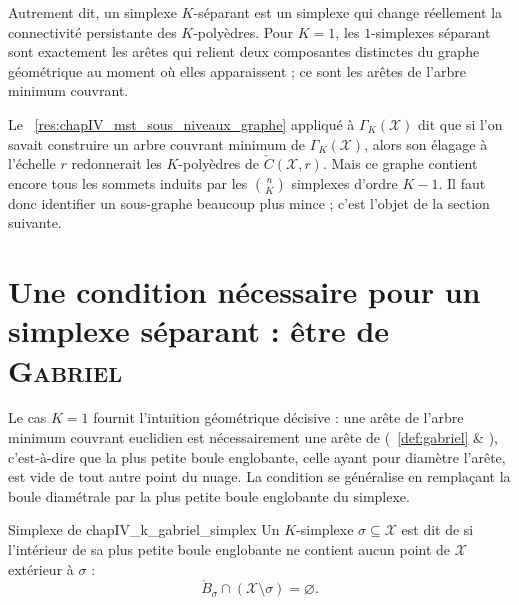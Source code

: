 Autrement dit, un simplexe $K$-séparant est un simplexe qui change réellement la connectivité persistante des $K$-polyèdres. Pour $K=1$, les $1$-simplexes séparant sont exactement les arêtes qui relient deux composantes distinctes du graphe géométrique au moment où elles apparaissent ; ce sont les arêtes de l'arbre minimum couvrant.

Le \Res~\ref{res:chapIV_mst_sous_niveaux_graphe} appliqué à $\Gamma_K(\mathcal X)$ dit que si l'on savait construire un arbre couvrant minimum de $\Gamma_K(\mathcal X)$, alors son élagage à l'échelle $r$ redonnerait les $K$-polyèdres de $\check C(\mathcal X,r)$. Mais ce graphe contient encore tous les sommets induits par les $\binom n{K}$ simplexes d'ordre $K-1$. Il faut donc identifier un sous-graphe beaucoup plus mince ; c'est l'objet de la section suivante.

\section{Une condition nécessaire pour un simplexe séparant : être de \textsc{Gabriel}}
\label{sec:chapIV_k_gabriel}

Le cas $K=1$ fournit l'intuition géométrique décisive : une arête de l'arbre minimum couvrant euclidien est nécessairement une arête de  (\Def~\ref{def:gabriel} \& ), c'est-à-dire que la plus petite boule englobante, celle ayant pour diamètre l'arête, est vide de tout autre point du nuage. La condition se généralise en remplaçant la boule diamétrale par la plus petite boule englobante du simplexe.

\begin{Definition}{Simplexe de }{chapIV_k_gabriel_simplex}
Un $K$-simplexe $\sigma\subseteq\mathcal X$ est dit de \emph{} si l'intérieur de sa plus petite boule englobante ne contient aucun point de $\mathcal X$ extérieur à $\sigma$ :
\[
\boxed{
    \mathring{B}_\sigma\cap(\mathcal X\setminus\sigma)=\varnothing.
    }
\]
\end{Definition}


